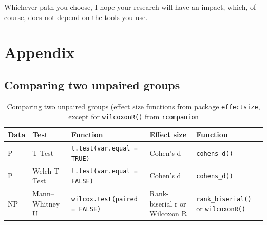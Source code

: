 \documentclass[
  letterpaper,
]{krantz}
\begin{document}
Whichever path you choose, I hope your research will have an impact,
which, of course, does not depend on the tools you use.


\chapter*{Appendix}\label{sec-appendix}


\section*{Comparing two unpaired
groups}\label{sec-comparing-two-unpaired-groups}


\begingroup
\fontsize{9.0pt}{10.8pt}\selectfont
\setlength{\LTpost}{0mm}

\begin{longtable}{>{\raggedright\arraybackslash}p{\dimexpr 30.00pt -2\tabcolsep-1.5\arrayrulewidth}>{\raggedright\arraybackslash}p{\dimexpr 60.00pt -2\tabcolsep-1.5\arrayrulewidth}>{\raggedright\arraybackslash}p{\dimexpr 97.50pt -2\tabcolsep-1.5\arrayrulewidth}>{\raggedright\arraybackslash}p{\dimexpr 75.00pt -2\tabcolsep-1.5\arrayrulewidth}>{\raggedright\arraybackslash}p{\dimexpr 75.00pt -2\tabcolsep-1.5\arrayrulewidth}}

\caption{\label{tbl-comparing-two-groups-unpaired-baser}Comparing two
unpaired groups (effect size functions from package \texttt{effectsize},
except for \texttt{wilcoxonR()} from \texttt{rcompanion}}

\tabularnewline

\toprule
Data & Test & Function & Effect size & Function \\ 
\midrule\addlinespace[2.5pt]
P & T-Test & \texttt{t.test(var.equal = TRUE)} & Cohen's d & \texttt{cohens\_d()} \\ 
P & Welch T-Test & \texttt{t.test(var.equal = FALSE)} & Cohen's d & \texttt{cohens\_d()} \\ 
NP & Mann--Whitney U & \texttt{wilcox.test(paired = FALSE)} & Rank-biserial r
or
Wilcoxon R & \texttt{rank\_biserial()}
or
\texttt{wilcoxonR()} \\ 
\bottomrule

\end{longtable}
\end{document}
